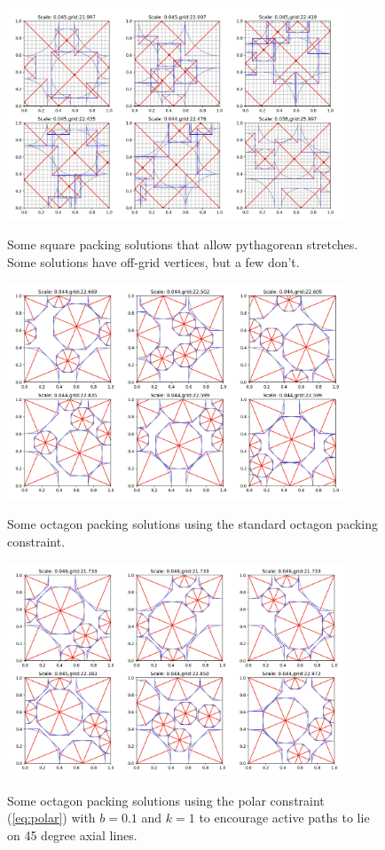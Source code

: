 \documentclass[12pt]{article}
\begin{document}
\begin{figure}
    \centering
    \includegraphics[width=0.9\textwidth]{square packings pythas.png}\label{fig:squares pythas}\caption{Some square packing solutions that allow pythagorean stretches. Some solutions have off-grid vertices, but a few don't.}
\end{figure}

\begin{figure}
    \centering
    \includegraphics[width=0.9\textwidth]{octagon packings 2.png}\label{fig:octagon packings}\caption{Some octagon packing solutions using the standard octagon packing constraint.}
\end{figure}
\begin{figure}
    \centering
    \includegraphics[width=0.9\textwidth]{octagon packings polar.png}\label{fig:octagon packings polar}\caption{Some octagon packing solutions using the polar constraint (\ref{eq:polar}) with $b=0.1$ and $k=1$ to encourage active paths to lie on 45 degree axial lines.}
\end{figure}

 
\end{document}
